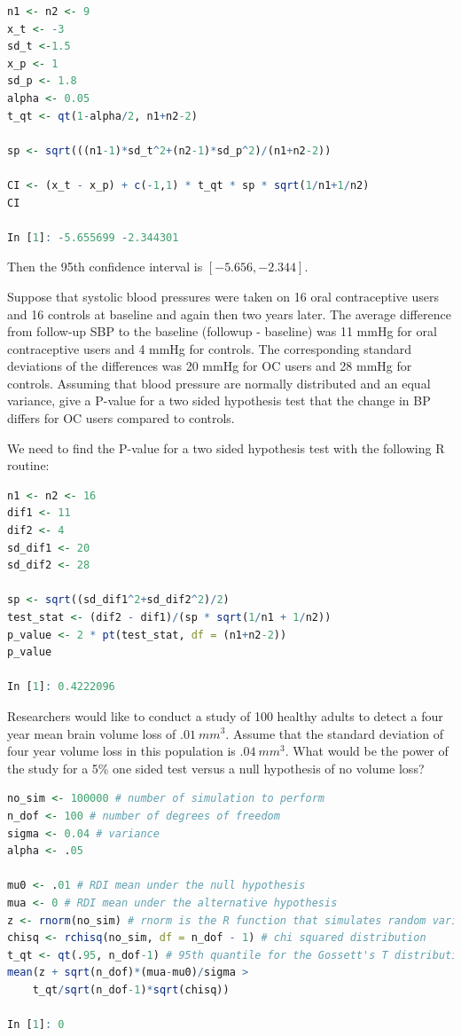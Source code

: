 \documentclass{homework}
\begin{document}
\begin{lstlisting}[language=R]
n1 <- n2 <- 9
x_t <- -3
sd_t <-1.5
x_p <- 1
sd_p <- 1.8
alpha <- 0.05
t_qt <- qt(1-alpha/2, n1+n2-2)

sp <- sqrt(((n1-1)*sd_t^2+(n2-1)*sd_p^2)/(n1+n2-2))

CI <- (x_t - x_p) + c(-1,1) * t_qt * sp * sqrt(1/n1+1/n2)
CI

In [1]: -5.655699 -2.344301
\end{lstlisting}

Then the 95th confidence interval is $[-5.656, -2.344]$. \\

\begin{tcolorbox}[title=Question 7]
Suppose that systolic blood pressures were taken on 16 oral contraceptive users and 16 controls at baseline and again then two years later. The average difference from follow-up SBP to the baseline (followup - baseline) was 11 mmHg for oral contraceptive users and 4 mmHg for controls. The corresponding standard deviations of the differences was 20 mmHg for OC users and 28 mmHg for controls. Assuming that blood pressure are normally distributed and an equal variance, give a P-value for a two sided hypothesis test that the change in BP differs for OC users compared to controls.
\end{tcolorbox}

We need to find the P-value for a two sided hypothesis test with the following R routine: 

\begin{lstlisting}[language=R]
n1 <- n2 <- 16
dif1 <- 11
dif2 <- 4
sd_dif1 <- 20
sd_dif2 <- 28

sp <- sqrt((sd_dif1^2+sd_dif2^2)/2)
test_stat <- (dif2 - dif1)/(sp * sqrt(1/n1 + 1/n2))
p_value <- 2 * pt(test_stat, df = (n1+n2-2))
p_value

In [1]: 0.4222096
\end{lstlisting}

\begin{tcolorbox}[title=Question 8]
Researchers would like to conduct a study of 100 healthy adults to detect a four year mean brain volume loss of $.01~mm^3$. Assume that the standard deviation of four year volume loss in this population is $.04~mm^3$. What would be the power of the study for a 5\% one sided test versus a null hypothesis of no volume loss?
\end{tcolorbox}

\begin{lstlisting}[language=R]
no_sim <- 100000 # number of simulation to perform 
n_dof <- 100 # number of degrees of freedom
sigma <- 0.04 # variance 
alpha <- .05 

mu0 <- .01 # RDI mean under the null hypothesis
mua <- 0 # RDI mean under the alternative hypothesis
z <- rnorm(no_sim) # rnorm is the R function that simulates random variables having a specified normal distribution
chisq <- rchisq(no_sim, df = n_dof - 1) # chi squared distribution
t_qt <- qt(.95, n_dof-1) # 95th quantile for the Gossett's T distribution
mean(z + sqrt(n_dof)*(mua-mu0)/sigma > 
    t_qt/sqrt(n_dof-1)*sqrt(chisq))
    
In [1]: 0
\end{lstlisting}
\end{document}
